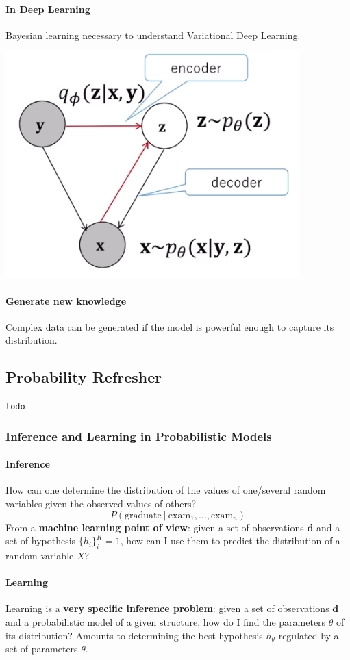 \documentclass[10pt]{report}
\begin{document}
\paragraph{In Deep Learning} Bayesian learning necessary to understand Variational Deep Learning.
\begin{center}
	\includegraphics[scale=0.5]{14.png}
\end{center}
\paragraph{Generate new knowledge} Complex data can be generated if the model is powerful enough to capture its distribution.
\subsection{Probability Refresher}
\texttt{todo}
\subsubsection{Inference and Learning in Probabilistic Models}
\paragraph{Inference} How can one determine the distribution of the values of one/several random variables given the observed values of others?
$$P(\text{graduate}\:|\:\text{exam}_1,\ldots,\text{exam}_n)$$
From a \textbf{machine learning point of view}: given a set of observations $\mathbf{d}$ and a set of hypothesis $\{h_i\}_i^K=1$, how can I use them to predict the distribution of a random variable $X$?
\paragraph{Learning} Learning is a \textbf{very specific inference problem}: given a set of observations $\mathbf{d}$ and a probabilistic model of a given structure, how do I find the parameters $\theta$ of its distribution? Amounts to determining the best hypothesis $h_\theta$ regulated by a set of parameters $\theta$.
\end{document}
